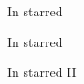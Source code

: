 \documentclass{article}
\begin{document}
\begin{enumext*}[columns=2]
\item In starred
\item In starred

\item \begin{enumext}[nosep]
    \item \begin{enumext}%
    \item In starred II
  \end{enumext}

    
  \end{enumext}
  
\end{enumext*}
\end{document}
